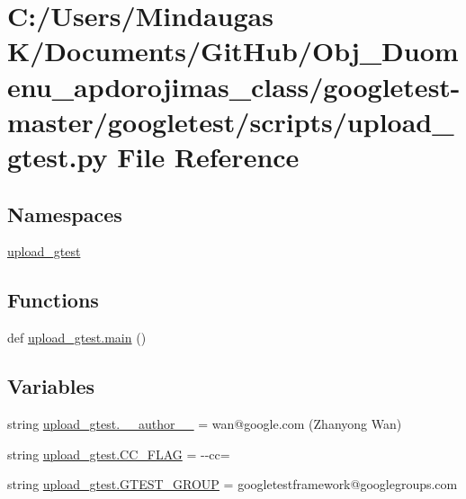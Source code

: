 \hypertarget{googletest-master_2googletest_2scripts_2upload__gtest_8py}{}\section{C\+:/\+Users/\+Mindaugas K/\+Documents/\+Git\+Hub/\+Obj\+\_\+\+Duomenu\+\_\+apdorojimas\+\_\+class/googletest-\/master/googletest/scripts/upload\+\_\+gtest.py File Reference}
\label{googletest-master_2googletest_2scripts_2upload__gtest_8py}
\subsection*{Namespaces}
\begin{DoxyCompactItemize}
\item 
 \mbox{\hyperlink{namespaceupload__gtest}{upload\+\_\+gtest}}
\end{DoxyCompactItemize}
\subsection*{Functions}
\begin{DoxyCompactItemize}
\item 
def \mbox{\hyperlink{namespaceupload__gtest_ab5bef7b968c54c632a52c1b4a3d37bdd}{upload\+\_\+gtest.\+main}} ()
\end{DoxyCompactItemize}
\subsection*{Variables}
\begin{DoxyCompactItemize}
\item 
string \mbox{\hyperlink{namespaceupload__gtest_ae7f6ee6ec8f85faa6fb72465afce7c0d}{upload\+\_\+gtest.\+\_\+\+\_\+author\+\_\+\+\_\+}} = \textquotesingle{}wan@google.\+com (Zhanyong Wan)\textquotesingle{}
\item 
string \mbox{\hyperlink{namespaceupload__gtest_a83f0946f9ee3731253fc622acd581fc2}{upload\+\_\+gtest.\+C\+C\+\_\+\+F\+L\+AG}} = \textquotesingle{}-\/-\/cc=\textquotesingle{}
\item 
string \mbox{\hyperlink{namespaceupload__gtest_af282f4c60bf6069ed0abf4e06d9b70ab}{upload\+\_\+gtest.\+G\+T\+E\+S\+T\+\_\+\+G\+R\+O\+UP}} = \textquotesingle{}googletestframework@googlegroups.\+com\textquotesingle{}
\end{DoxyCompactItemize}
